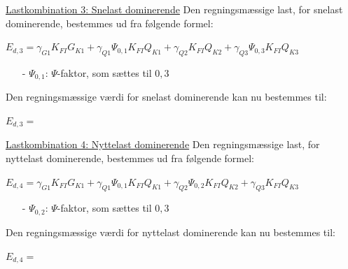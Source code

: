 \underline{Lastkombination 3: Snelast dominerende}
\newline
Den regningsmæssige last, for snelast dominerende, bestemmes ud fra følgende formel:
\begin{center}
 	$E_{d,3}=\gamma_{G1}K_{FI} G_{K1}+\gamma_{Q1}\Psi_{0,\!1}K_{FI}Q_{K1}+\gamma_{Q2}K_{FI}Q_{K2}+\gamma_{Q3}\Psi_{0,3}K_{FI}Q_{K3}$
\end{center}
\begin{itemize}
	\item[-] $\Psi_{0,\!1}$: $\Psi$-faktor, som sættes til $0,\!3$ \citep[ tabel A 1.1 anneks A.1.2.2]{EU90}
\end{itemize}
Den regningsmæssige værdi for snelast dominerende kan nu bestemmes til:
\begin{center}
	$E_{d,3}=$
\end{center}

\underline{Lastkombination 4: Nyttelast dominerende}
\newline
Den regningsmæssige last, for nyttelast dominerende, bestemmes ud fra følgende formel:
\begin{center}
	$E_{d,4}=\gamma_{G1}K_{FI}G_{K1}+\gamma_{Q1}\Psi_{0,\!1}K_{FI}Q_{K1}+\gamma_{Q2}\Psi_{0,\!2}K_{FI}Q_{K2}+\gamma_{Q3}K_{FI}Q_{K3}$
\end{center}
\begin{itemize}
	\item[-] $\Psi_{0,\!2}$: $\Psi$-faktor, som sættes til $0,\!3$ \citep[ tabel A 1.1 anneks A.1.2.2]{EU90}
\end{itemize}
Den regningsmæssige værdi for nyttelast dominerende kan nu bestemmes til:
\begin{center}
	$E_{d,4}=$
\end{center}